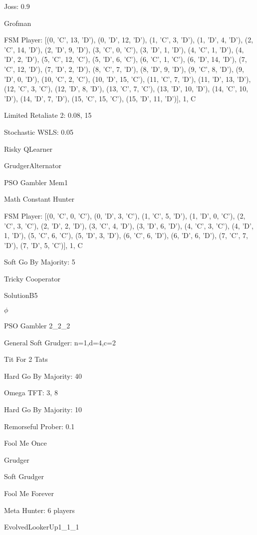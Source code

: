 \item Joss: 0.9
\item Grofman
\item FSM Player: [(0, 'C', 13, 'D'), (0, 'D', 12, 'D'), (1, 'C', 3, 'D'), (1, 'D', 4, 'D'), (2, 'C', 14, 'D'), (2, 'D', 9, 'D'), (3, 'C', 0, 'C'), (3, 'D', 1, 'D'), (4, 'C', 1, 'D'), (4, 'D', 2, 'D'), (5, 'C', 12, 'C'), (5, 'D', 6, 'C'), (6, 'C', 1, 'C'), (6, 'D', 14, 'D'), (7, 'C', 12, 'D'), (7, 'D', 2, 'D'), (8, 'C', 7, 'D'), (8, 'D', 9, 'D'), (9, 'C', 8, 'D'), (9, 'D', 0, 'D'), (10, 'C', 2, 'C'), (10, 'D', 15, 'C'), (11, 'C', 7, 'D'), (11, 'D', 13, 'D'), (12, 'C', 3, 'C'), (12, 'D', 8, 'D'), (13, 'C', 7, 'C'), (13, 'D', 10, 'D'), (14, 'C', 10, 'D'), (14, 'D', 7, 'D'), (15, 'C', 15, 'C'), (15, 'D', 11, 'D')], 1, C
\item Limited Retaliate 2: 0.08, 15
\item Stochastic WSLS: 0.05
\item Risky QLearner
\item GrudgerAlternator
\item PSO Gambler Mem1
\item Math Constant Hunter
\item FSM Player: [(0, 'C', 0, 'C'), (0, 'D', 3, 'C'), (1, 'C', 5, 'D'), (1, 'D', 0, 'C'), (2, 'C', 3, 'C'), (2, 'D', 2, 'D'), (3, 'C', 4, 'D'), (3, 'D', 6, 'D'), (4, 'C', 3, 'C'), (4, 'D', 1, 'D'), (5, 'C', 6, 'C'), (5, 'D', 3, 'D'), (6, 'C', 6, 'D'), (6, 'D', 6, 'D'), (7, 'C', 7, 'D'), (7, 'D', 5, 'C')], 1, C
\item Soft Go By Majority: 5
\item Tricky Cooperator
\item SolutionB5
\item $\phi$
\item PSO Gambler 2\_2\_2
\item General Soft Grudger: n=1,d=4,c=2
\item Tit For 2 Tats
\item Hard Go By Majority: 40
\item Omega TFT: 3, 8
\item Hard Go By Majority: 10
\item Remorseful Prober: 0.1
\item Fool Me Once
\item Grudger
\item Soft Grudger
\item Fool Me Forever
\item Meta Hunter: 6 players
\item EvolvedLookerUp1\_1\_1
